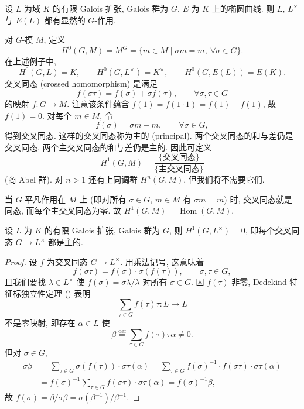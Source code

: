 \begin{example} \label{thm:4.1.1} 
设 $L$ 为域 $K$ 的有限 Galois 扩张, Galois 群为 $G$, $E$ 为 $K$ 上的椭圆曲线. 则 $L$, $L^{\times}$ 与 $E(L)$ 都有显然的 $G$-作用.
\end{example}

对 $G$-模 $M$, 定义
\[
H^0(G, M) = M^G = \{m\in M \mid \sigma m = m, \ \forall\sigma\in G\}.
\]
在上述例子中,
\[
H^0(G, L) = K, \qquad H^0(G, L^{\times}) = K^{\times}, \qquad H^0(G, E(L)) = E(K).
\]
交叉同态 (crossed homomorphism) 是满足
\[
f(\sigma\tau) = f(\sigma) + \sigma f(\tau), \qquad \forall\sigma,\tau\in G
\]
的映射 $f\colon G\to M$. 注意该条件蕴含 $f(1) = f(1\cdot 1) = f(1) + f(1)$, 故 $f(1) = 0$. 对每个 $m\in M$, 令
\[
f(\sigma) = \sigma m - m, \qquad \forall\sigma\in G,
\]
得到交叉同态. 这样的交叉同态称为主的 (principal). 两个交叉同态的和与差仍是交叉同态, 两个主交叉同态的和与差仍是主的. 因此可定义
\[
H^1(G, M) = \frac{\{\text{交叉同态}\}}{\{\text{主交叉同态}\}}
\]
(商 Abel 群). 对 $n > 1$ 还有上同调群 $H^n(G, M)$, 但我们将不需要它们.

\begin{example} \label{thm:4.1.2} 
当 $G$ 平凡作用在 $M$ 上 (即对所有 $\sigma\in G$, $m\in M$ 有 $\sigma m = m$) 时, 交叉同态就是同态, 而每个主交叉同态为零. 故 $H^1(G, M) = \operatorname{Hom}(G, M)$.
\end{example}

\begin{proposition} \label{thm:4.1.3} 
设 $L$ 为 $K$ 的有限 Galois 扩张, Galois 群为 $G$, 则 $H^1(G, L^{\times}) = 0$, 即每个交叉同态 $G\to L^{\times}$ 都是主的.
\end{proposition}

\begin{proof}
设 $f$ 为交叉同态 $G\to L^{\times}$. 用乘法记号, 这意味着
\[
f(\sigma\tau) = f(\sigma)\cdot\sigma(f(\tau)), \qquad \sigma, \tau\in G,
\]
且我们要找 $\lambda\in L^{\times}$ 使 $f(\sigma) = \sigma\lambda/\lambda$ 对所有 $\sigma\in G$. 因 $f(\tau)$ 非零, Dedekind 特征标独立性定理 (\cite[5.14]{milne-ft}) 表明
\[
\sum_{\tau\in G}f(\tau)\tau\colon L\to L
\]
不是零映射, 即存在 $\alpha\in L$ 使
\[
\beta \overset{\text{def}}{=} \sum_{\tau\in G}f(\tau)\tau\alpha\neq 0.
\]
但对 $\sigma\in G$,
\begin{align*}
\sigma\beta &= \sum_{\tau\in G}\sigma(f(\tau))\cdot\sigma\tau(\alpha) = \sum_{\tau\in G}f(\sigma)^{-1}\cdot f(\sigma\tau)\cdot\sigma\tau(\alpha)\\
&= f(\sigma)^{-1}\sum_{\tau\in G}f(\sigma\tau)\cdot\sigma\tau(\alpha) = f(\sigma)^{-1}\beta,
\end{align*}
故 $f(\sigma) = \beta/\sigma\beta = \sigma(\beta^{-1})/\beta^{-1}$.
\end{proof}

